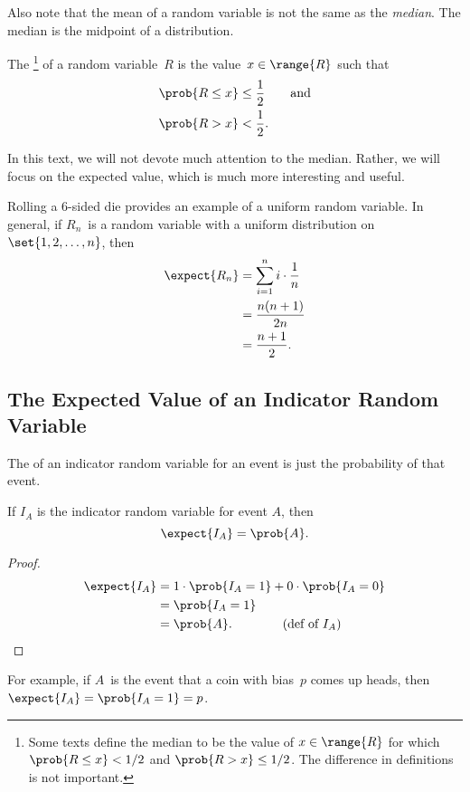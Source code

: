 Also note that the mean of a random variable is not the same as the
\emph{median}.  The median is the midpoint of a distribution.

\begin{definition}\label{def:17A2}
The \footnote{Some texts define the median to be the
  value of $x \in \range{R}$ for which $\prob{R \le x} < 1/2$ and
  $\prob{R > x} \le 1/2$.  The difference in definitions is
  not important.} of a random variable~$R$ is the value~$x \in
\range{R}$ such that
\begin{align*}
    \prob{R \le x} & \le \frac{1}{2} \qquad \text{and} \\
    \prob{R > x}   & <    \frac{1}{2}.
\end{align*}
\end{definition}

In this text, we will not devote much attention to the median.
Rather, we will focus on the expected value, which is much more
interesting and useful.

Rolling a 6-sided die provides an example of a uniform random
variable.  In general, if $R_n$~is a random variable with a uniform
distribution on~$\set{1, 2, \dots, n}$, then
\begin{align*}
\expect{R_n}    &= \sum_{i = 1}^n i \cdot \frac{1}{n} \\
                &= \frac{n (n + 1)}{2n} \\
                &= \frac{n + 1}{2}.
\end{align*}

\subsection{The Expected Value of an Indicator Random Variable}

The  of an  indicator random
variable for an event is just the probability of that event.

\begin{lemma}\label{expindic}
If $I_A$ is the indicator random variable for event $A$, then
\[
\expect{I_A} = \prob{A}.
\]
\end{lemma}

\begin{proof}
\begin{align*}
\expect{I_A}
& =  1 \cdot \prob{I_A = 1} + 0 \cdot \prob{I_A = 0} \\
& = \prob{I_A = 1} \\
& =  \prob{A}. \qquad\qquad \text{(def of $I_A$)}\qedhere
\end{align*}
\end{proof}
For example, if $A$~is the event that a coin with bias~$p$ comes up
heads, then $\expect{I_A} = \prob{I_A=1} = p$.

